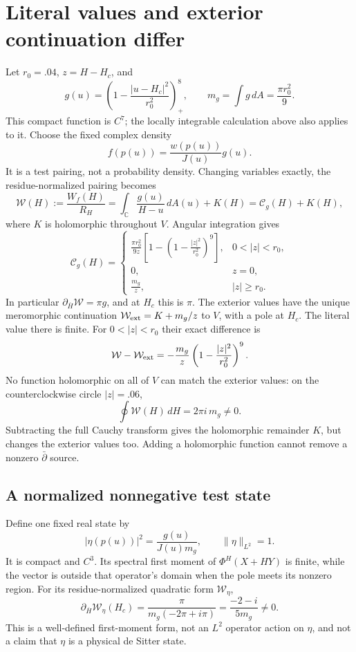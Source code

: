 \documentclass[11pt,a4paper]{article}
\newcommand{\db}{\partial_{\overline H}}
\newcommand{\CC}{\mathbb C}
\begin{document}
\newpage
\section{Literal values and exterior continuation differ}
Let $r_0=.04$, $z=H-H_c$, and
\[
 g(u)=\left(1-\frac{|u-H_c|^2}{r_0^2}\right)_+^8,
 \qquad m_g=\int g\,dA=\frac{\pi r_0^2}{9}.
\]
This compact function is $C^7$; the locally integrable calculation above
also applies to it. Choose the fixed complex density
\[
 f(p(u))=\frac{w(p(u))}{J(u)}g(u).
\]
It is a test pairing, not a probability density. Changing variables
exactly, the residue-normalized pairing becomes
\[
 \mathcal W(H):=\frac{W_f(H)}{R_H}
       =\int_{\CC}\frac{g(u)}{H-u}\,dA(u)+K(H)
       =\mathcal C_g(H)+K(H),
\]
where $K$ is holomorphic throughout $V$. Angular integration gives
\[
 \mathcal C_g(H)=
 \begin{cases}
 \displaystyle\frac{\pi r_0^2}{9z}
       \left[1-\left(1-\frac{|z|^2}{r_0^2}\right)^9\right],
       &0<|z|<r_0,\\[6pt]
 0,&z=0,\\[2pt]
 \displaystyle\frac{m_g}{z},&|z|\geq r_0 .
 \end{cases}
\]
In particular $\db\mathcal W=\pi g$, and at $H_c$ this is $\pi$.
The exterior values have the unique meromorphic continuation
$\mathcal W_{\rm ext}=K+m_g/z$ to $V$, with a pole at $H_c$.
The literal value there is finite. For $0<|z|<r_0$ their exact difference is
\[
 \mathcal W-\mathcal W_{\rm ext}
       =-\frac{m_g}{z}
         \left(1-\frac{|z|^2}{r_0^2}\right)^9.
\]
No function holomorphic on all of $V$ can match the exterior values:
on the counterclockwise circle $|z|=.06$,
\[
 \oint\mathcal W(H)\,dH=2\pi i\,m_g\ne0 .
\]
Subtracting the full Cauchy transform gives the holomorphic remainder
$K$, but changes the exterior values too. Adding a holomorphic function
cannot remove a nonzero $\bar\partial$ source.

\subsection*{A normalized nonnegative test state}
Define one fixed real state by
\[
 |\eta(p(u))|^2=\frac{g(u)}{J(u)m_g},\qquad\|\eta\|_{L^2}=1.
\]
It is compact and $C^3$. Its spectral first moment of $\Phi^H(X+HY)$
is finite, while the vector is outside that operator's domain when
the pole meets its nonzero region. For its residue-normalized quadratic
form $\mathcal W_\eta$,
\[
 \db\mathcal W_\eta(H_c)
 =\frac{\pi}{m_g(-2\pi+i\pi)}
 =\frac{-2-i}{5m_g}\ne0.
\]
This is a well-defined first-moment form, not an $L^2$ operator action
on $\eta$, and not a claim that $\eta$ is a physical de Sitter state.
\end{document}

